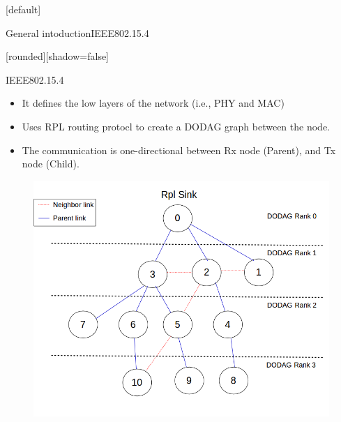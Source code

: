 \documentclass{beamer}
\makeatletter
\newenvironment{withoutheadline}{
        \setbeamertemplate{headline}[default]
        \def\beamer@entrycode{\vspace*{-\headheight}}
    }{}
\makeatother
\begin{document}
\begin{withoutheadline}
\begin{frame}{General intoduction}{IEEE802.15.4}

[rounded][shadow=false]


\begin{minipage}[t]{0.48\linewidth}

\begin{block}{IEEE802.15.4}
    \begin{itemize}
    \item It defines the low layers of the network (i.e., PHY and MAC) 
    \item Uses RPL routing protocl to create a DODAG graph between the node.
    \item The communication is one-directional between Rx node (Parent), and Tx node (Child). 
    
    \end{itemize}
    \end{block}
\end{minipage}\hfill
\begin{minipage}[t]{0.48\linewidth}
\centering
\begin{figure}[p]

\includegraphics[width=\linewidth]{rpl3.png}
\end{figure}
\end{minipage}

   
    
    

\end{frame}
\end{withoutheadline}
\end{document}
